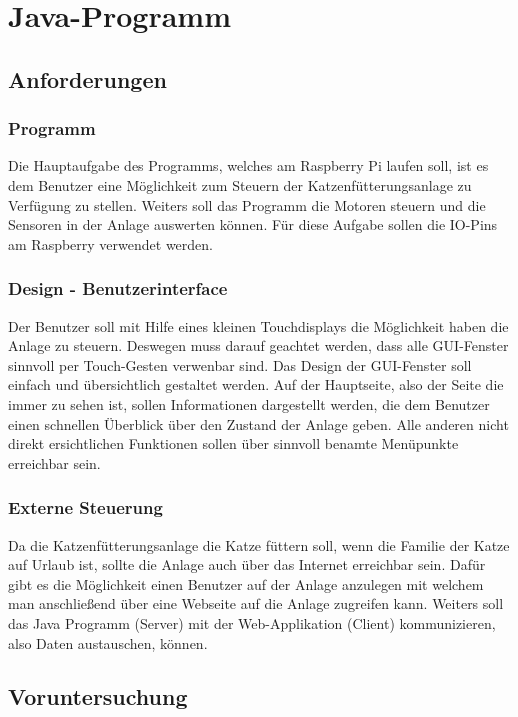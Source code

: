 
\chapter{Java-Programm}
\label{sec:java-programm}

\section{Anforderungen}
\subsection{Programm}
Die Hauptaufgabe des Programms, welches am Raspberry Pi laufen soll, ist es dem Benutzer eine Möglichkeit zum Steuern der Katzenfütterungsanlage zu Verfügung zu stellen. Weiters soll das Programm die Motoren steuern und die Sensoren in der Anlage auswerten können. Für diese Aufgabe sollen die IO-Pins am Raspberry verwendet werden.
\subsection{Design - Benutzerinterface}
Der Benutzer soll mit Hilfe eines kleinen Touchdisplays die Möglichkeit haben die Anlage zu steuern. Deswegen muss darauf geachtet werden, dass alle GUI-Fenster sinnvoll per Touch-Gesten verwenbar sind.
Das Design der GUI-Fenster soll einfach und übersichtlich gestaltet werden. Auf der Hauptseite, also der Seite die immer zu sehen ist, sollen Informationen dargestellt werden, die dem Benutzer einen schnellen Überblick über den Zustand der Anlage geben. Alle anderen nicht direkt ersichtlichen Funktionen sollen über sinnvoll benamte Menüpunkte erreichbar sein.
\subsection{Externe Steuerung}
Da die Katzenfütterungsanlage die Katze füttern soll, wenn die Familie der Katze auf Urlaub ist, sollte die Anlage auch über das Internet erreichbar sein. Dafür gibt es die Möglichkeit einen Benutzer auf der Anlage anzulegen mit welchem man anschließend über eine Webseite auf die Anlage zugreifen kann. Weiters soll das Java Programm (Server) mit der Web-Applikation (Client) kommunizieren, also Daten austauschen, können.

\newpage

\section{Voruntersuchung}

